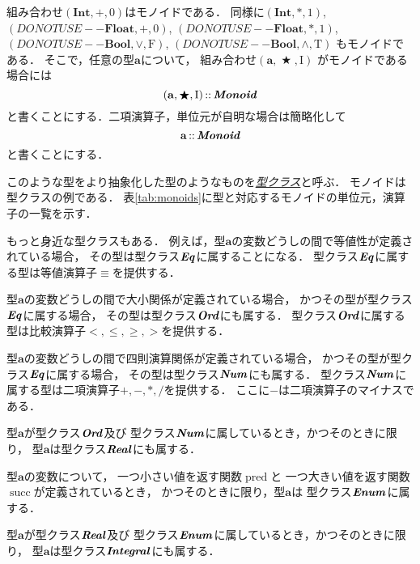 \documentclass[a5paper,draft]{jsbook}
\newcommand{\keyword}[1]{{\underline{\emph{#1}}}}
\newcommand{\mathConstant}[1]{\mathrm{#1}} %
\newcommand{\mathTypeParameter}[1]{\mathbf{#1}}
\newcommand{\mathTypeName}[1]{\mathbf{#1}}
\newcommand{\mathTypeClass}[1]{\textbf{\emph{#1}}} %
\newcommand{\mathTupleWith}[1]{\left(#1\right)}
\newcommand{\mathTrue}{\mathConstant{T}}
\newcommand{\mathFalse}{\mathConstant{F}}
\DeclareMathOperator{\mathPred}{pred}
\DeclareMathOperator{\mathSucc}{succ}
\newcommand{\mathBinaryOperator}[1]{\operatorname{#1}}
\newcommand{\mathAnyBinaryOperator}{\mathBinaryOperator{\bigstar}}
\newcommand{\mathIn}{\mathBinaryOperator{:\!:}}
\newcommand{\mathMonoid}[3]{(#1,#2,#3)}
\newcommand{\hsklBool}{{DO NOT USE}--\mathTypeParameter{Bool}}
\newcommand{\hsklFloat}{{DO NOT USE}--\mathTypeParameter{Float}}
\begin{document}
組み合わせ$\mathMonoid{\mathTypeName{Int}}{+}{0}$はモノイドである．
同様に$\mathMonoid{\mathTypeName{Int}}{*}{1}$,
$\mathMonoid{\hsklFloat}{+}{0}$,
$\mathMonoid{\hsklFloat}{*}{1}$,
$\mathMonoid{\hsklBool}{\vee}{\mathFalse}$,
$\mathMonoid{\hsklBool}{\wedge}{\mathTrue}$ もモノイドである．
そこで，任意の型$\mathTypeParameter{a}$について，
組み合わせ$\mathTupleWith{\mathTypeParameter{a},\mathAnyBinaryOperator,\mathConstant{I}}$
がモノイドである場合には
\begin{equation}
\mathTupleWith{\mathTypeParameter{a},\mathAnyBinaryOperator,\mathConstant{I}}\mathIn\mathTypeClass{Monoid}
\end{equation}
と書くことにする．二項演算子，単位元が自明な場合は簡略化して
\begin{equation}
\mathTypeParameter{a}\mathIn\mathTypeClass{Monoid}
\end{equation}
と書くことにする．

このような型をより抽象化した型のようなものを\keyword{型クラス}と呼ぶ．
モノイドは型クラスの例である．
表\ref{tab:monoids}に型と対応するモノイドの単位元，演算子の一覧を示す．

もっと身近な型クラスもある．
例えば，型$\mathTypeParameter{a}$の変数どうしの間で等値性が定義されている場合，
その型は型クラス$\mathTypeClass{Eq}$に属することになる．
型クラス$\mathTypeClass{Eq}$に属する型は等値演算子$\equiv$を提供する．

型$\mathTypeParameter{a}$の変数どうしの間で大小関係が定義されている場合，
かつその型が型クラス$\mathTypeClass{Eq}$に属する場合，
その型は型クラス$\mathTypeClass{Ord}$にも属する．
型クラス$\mathTypeClass{Ord}$に属する型は比較演算子$<,\le,\ge,>$を提供する．

型$\mathTypeParameter{a}$の変数どうしの間で四則演算関係が定義されている場合，
かつその型が型クラス$\mathTypeClass{Eq}$に属する場合，
その型は型クラス$\mathTypeClass{Num}$にも属する．
型クラス$\mathTypeClass{Num}$に属する型は二項演算子$+,-,*,/$を提供する．
ここに$-$は二項演算子のマイナスである．

型$\mathTypeParameter{a}$が型クラス$\mathTypeClass{Ord}$及び
型クラス$\mathTypeClass{Num}$に属しているとき，かつそのときに限り，
型$\mathTypeParameter{a}$は型クラス$\mathTypeClass{Real}$にも属する．

型$\mathTypeParameter{a}$の変数について，
一つ小さい値を返す関数$\mathPred$と
一つ大きい値を返す関数$\mathSucc$が定義されているとき，
かつそのときに限り，型$\mathTypeParameter{a}$は
型クラス$\mathTypeClass{Enum}$に属する．

型$\mathTypeParameter{a}$が型クラス$\mathTypeClass{Real}$及び
型クラス$\mathTypeClass{Enum}$に属しているとき，かつそのときに限り，
型$\mathTypeParameter{a}$は型クラス$\mathTypeClass{Integral}$にも属する．
\end{document}
